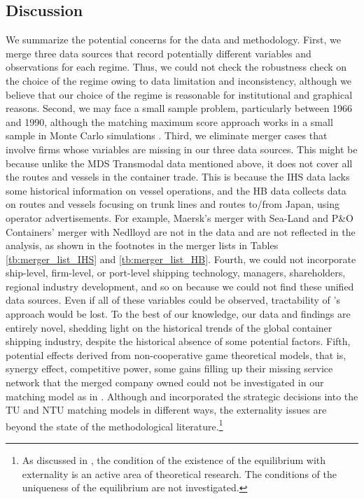 \documentclass[10pt]{article}
\begin{document}
\subsection{Discussion}
We summarize the potential concerns for the data and methodology. 
First, we merge three data sources that record potentially different variables and observations for each regime. 
Thus, we could not check the robustness check on the choice of the regime owing to data limitation and inconsistency, although we believe that our choice of the regime is reasonable for institutional and graphical reasons.
Second, we may face a small sample problem, particularly between 1966 and 1990, although the matching maximum score approach works in a small sample in Monte Carlo simulations \citep{akkus2015ms,otani2021matching_cost}.
Third, we eliminate merger cases that involve firms whose variables are missing in our three data sources. 
This might be because unlike the MDS Transmodal data mentioned above, it does not cover all the routes and vessels in the container trade. This is because the IHS data lacks some historical information on vessel operations, and the HB data collects data on routes and vessels focusing on trunk lines and routes to/from Japan, using operator advertisements. For example, Maersk's merger with Sea-Land and P\&O Containers' merger with Nedlloyd are not in the data and are not reflected in the analysis, as shown in the footnotes in the merger lists in Tables \ref{tb:merger_list_IHS} and \ref{tb:merger_list_HB}.
Fourth, we could not incorporate ship-level, firm-level, or port-level shipping technology,  managers, shareholders, regional industry development, and so on because we could not find these unified data sources. 
Even if all of these variables could be observed, tractability of \cite{fox2018qe}'s approach would be lost.
To the best of our knowledge, our data and findings are entirely novel, shedding light on the historical trends of the global container shipping industry, despite the historical absence of some potential factors.
Fifth, potential effects derived from non-cooperative game theoretical models, that is, synergy effect, competitive power, some gains filling up their missing service network that the merged company owned could not be investigated in our matching model as in \cite{akkus2015ms}. 
Although \cite{fox2019externality} and \cite{uetake2019entry} incorporated the strategic decisions into the TU and NTU matching models in different ways, the externality issues are beyond the state of the methodological literature.\footnote{As discussed in \cite{agarwal2021market}, the condition of the existence of the equilibrium with externality is an active area of theoretical research. The conditions of the uniqueness of the equilibrium are not investigated. } 
\end{document}
